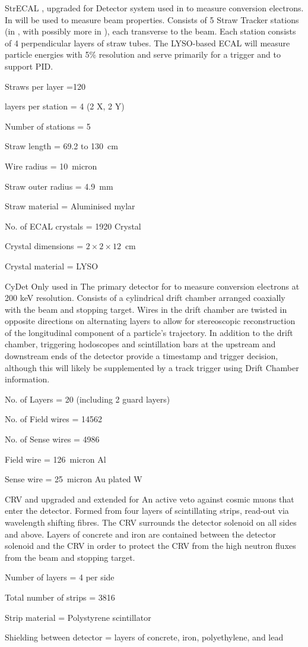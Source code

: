 {StrECAL}
{}
{\phaseI, upgraded for \phaseII}
{Detector system used in \phaseII to measure conversion electrons.   In \phaseI will be used to measure beam properties.  Consists of 5 Straw Tracker stations (in \phaseI, with possibly more in \phaseII), each transverse to the beam.  Each station consists of 4 perpendicular layers of straw tubes.  The LYSO-based ECAL will measure particle energies with 5\% resolution and serve primarily for a trigger and to support PID.}
{\item Straws per layer =120
 \item layers per station  = 4 (2 X, 2 Y)
 \item Number of stations = 5
 \item Straw length = 69.2 to 130~cm
 \item Wire radius = 10~micron
 \item Straw outer radius = 4.9~mm 
 \item Straw material = Aluminised mylar
 \item No. of ECAL crystals = 1920 Crystal
 \item Crystal dimensions = $2\times2\times12$~cm
 \item Crystal material = LYSO }

{CyDet}
{}
{Only used in \phaseI}
{The primary detector for \phaseI to measure conversion electrons at 200 keV resolution.  Consists of a cylindrical drift chamber arranged coaxially with the beam and stopping target.  Wires in the drift chamber are twisted in opposite directions on alternating layers to allow for stereoscopic reconstruction of the longitudinal component of a particle's trajectory.  In addition to the drift chamber, triggering hodoscopes and scintillation bars at the upstream and downstream ends of the detector provide a timestamp and trigger decision, although this will likely be supplemented by a track trigger using Drift Chamber information.}
{\item No. of Layers = 20 (including 2 guard layers)
 \item No. of Field wires = 14562
 \item No. of Sense wires = 4986
 \item Field wire = 126~micron Al
 \item Sense wire = 25~micron Au plated W }

{CRV}
{}
{\phaseI and upgraded and extended for \phaseII }
{An active veto against cosmic muons that enter the detector.  Formed from four layers of scintillating strips, read-out via wavelength shifting fibres.  The CRV surrounds the detector solenoid on all sides and above.  Layers of concrete and iron are contained between the detector solenoid and the CRV in order to protect the CRV from the high neutron fluxes from the beam and stopping target. }
{\item Number of layers = 4 per side
 \item Total number of strips = 3816  
 \item Strip material = Polystyrene scintillator 
 \item Shielding between detector = layers of concrete, iron, polyethylene, and lead }

